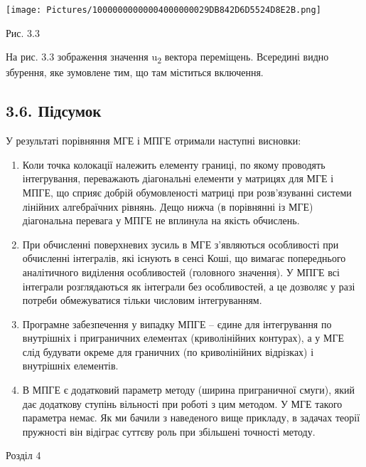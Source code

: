 \texttt{[image: Pictures/10000000000004000000029DB842D6D5524D8E2B.png]}

Рис. 3.3

На рис. 3.3 зображення значення u\textsubscript{2} вектора переміщень.
Всередині видно збурення, яке зумовлене тим, що там міститься включення.

\hypertarget{ux43fux456ux434ux441ux443ux43cux43eux43a-1}{%
\subsection[3.6.
Підсумок]{\texorpdfstring{\protect\hypertarget{anchor-52}{}{}3.6.
Підсумок}{3.6. Підсумок}}\label{ux43fux456ux434ux441ux443ux43cux43eux43a-1}}

У результаті порівняння МГЕ і МПГЕ отримали наступні висновки:

\begin{enumerate}
\def\labelenumi{\arabic{enumi}.}
\tightlist
\item
  Коли точка колокації належить елементу границі, по якому проводять
  інтегрування, переважають діагональні елементи у матрицях для МГЕ і
  МПГЕ, що сприяє добрій обумовленості матриці при розв'язуванні системи
  лінійних алгебраїчних рівнянь. Дещо нижча (в порівнянні із МГЕ)
  діагональна перевага у МПГЕ не вплинула на якість обчислень.
\item
  При обчисленні поверхневих зусиль в МГЕ з'являються особливості при
  обчисленні інтегралів, які існують в сенсі Коші, що вимагає
  попереднього аналітичного виділення особливостей (головного значення).
  У МПГЕ всі інтеграли розглядаються як інтеграли без особливостей, а це
  дозволяє у разі потреби обмежуватися тільки числовим інтегруванням.
\item
  Програмне забезпечення у випадку МПГЕ -- єдине для інтегрування по
  внутрішніх і приграничних елементах (криволінійних контурах), а у МГЕ
  слід будувати окреме для граничних (по криволінійних відрізках) і
  внутрішніх елементів.
\item
  В МПГЕ є додатковий параметр методу (ширина приграничної смуги), який
  дає додаткову ступінь вільності при роботі з цим методом. У МГЕ такого
  параметра немає. Як ми бачили з наведеного вище прикладу, в задачах
  теорії пружності він відіграє суттєву роль при збільшені точності
  методу.
\end{enumerate}

Розділ 4

